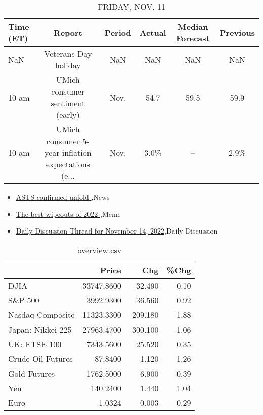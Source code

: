\documentclass{article}%
\begin{document}
%


\begin{table}[htbp]%
\caption{FRIDAY, NOV. 11}%
\centering%
\begin{adjustbox}{width=1\textwidth}%
\begin{tabular}{lccccc}
\toprule
Time (ET) &                                             Report & Period & Actual & Median Forecast & Previous \\
\midrule
      NaN &                               Veterans Day holiday &    NaN &    NaN &             NaN &      NaN \\
    10 am &                   UMich consumer sentiment (early) &   Nov. &   54.7 &            59.5 &     59.9 \\
    10 am & UMich consumer 5-year inflation expectations (e... &   Nov. &   3.0\% &              -- &     2.9\% \\
\bottomrule
\end{tabular}
%
\end{adjustbox}%
\end{table}

%
\begin{itemize}%
\item%
\href{https://reddit.com/r/wallstreetbets/comments/yuxn7l/asts\_confirmed\_unfold/}{ASTS confirmed unfold },News%
\item%
\href{https://reddit.com/r/wallstreetbets/comments/yuxe8g/the\_best\_wipeouts\_of\_2022/}{The best wipeouts of 2022 },Meme%
\item%
\href{https://reddit.com/r/wallstreetbets/comments/yuvvd0/daily\_discussion\_thread\_for\_november\_14\_2022/}{Daily Discussion Thread for November 14, 2022},Daily Discussion%
\end{itemize}%


\begin{table}[htbp]%
\caption{overview.csv}%
\centering%
\begin{adjustbox}{width=1\textwidth}%
\begin{tabular}{lrrr}
\toprule
                  &      Price &      Chg &  \%Chg \\
\midrule
             DJIA & 33747.8600 &   32.490 &  0.10 \\
          S\&P 500 &  3992.9300 &   36.560 &  0.92 \\
 Nasdaq Composite & 11323.3300 &  209.180 &  1.88 \\
Japan: Nikkei 225 & 27963.4700 & -300.100 & -1.06 \\
     UK: FTSE 100 &  7343.5600 &   25.520 &  0.35 \\
Crude Oil Futures &    87.8400 &   -1.120 & -1.26 \\
     Gold Futures &  1762.5000 &   -6.900 & -0.39 \\
              Yen &   140.2400 &    1.440 &  1.04 \\
             Euro &     1.0324 &   -0.003 & -0.29 \\
\bottomrule
\end{tabular}
%
\end{adjustbox}%
\end{table}
\end{document}
